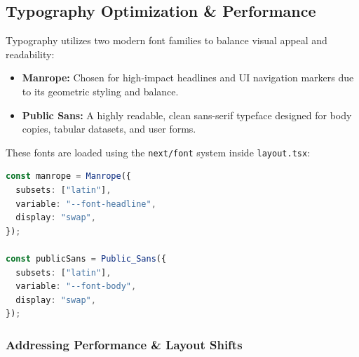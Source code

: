\documentclass[12pt,a4paper]{article}
\begin{document}
\subsection{Typography Optimization \& Performance}

Typography utilizes two modern font families to balance visual appeal and readability:
\begin{itemize}
    \item \textbf{Manrope:} Chosen for high-impact headlines and UI navigation markers due to its geometric styling and balance.
    \item \textbf{Public Sans:} A highly readable, clean sans-serif typeface designed for body copies, tabular datasets, and user forms.
\end{itemize}

These fonts are loaded using the \texttt{next/font} system inside \texttt{layout.tsx}:

\begin{lstlisting}[language=TypeScript,title={layout.tsx — Optimized font loading}]
const manrope = Manrope({
  subsets: ["latin"],
  variable: "--font-headline",
  display: "swap",
});

const publicSans = Public_Sans({
  subsets: ["latin"],
  variable: "--font-body",
  display: "swap",
});
\end{lstlisting}

\subsubsection{Addressing Performance \& Layout Shifts}
\end{document}
